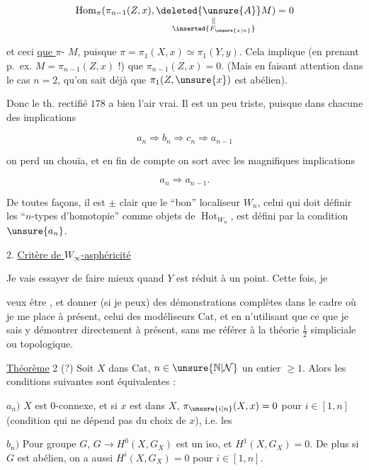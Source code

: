
\[
\operatorname{Hom}_{\pi}(\pi_{n-1}(Z,x),\underset{\substack{\Vert\\\inserted{F_{\unsure{x|n}}}}}{\deleted{\unsure{A}}M})=0
\]

et ceci \uline{ que  } $\pi$- $M$, puisque $\pi=\pi_1(X,x)\simeq\pi_1(Y,y)$. Cela implique (en prenant p.~ex. $M=\pi_{n-1}(Z,x)$ !) que $\pi_{n-1}(Z,x)=0$. (Mais en faisant attention dans le cas $n=2$, qu'on sait déjà que $\pi_1(Z,\unsure{x})$ est abélien).

Donc le th. rectifié  $178$ a bien l'air vrai. Il est un peu triste, puisque dans chacune des implications

\[
a_n\Longrightarrow b_n\Longrightarrow c_n\Longrightarrow a_{n-1}
\]

on perd un chouïa, et en fin de compte on sort avec les magnifiques implications

\[
a_n\Longrightarrow a_{n-1}.
\]

De toutes façons, il est $\pm$ clair que le ``bon'' localiseur $W_n$, celui qui doit définir les ``$n$-types d'homotopie'' comme objets de $\operatorname{Hot}_{W_n}$, est défini par la condition $\unsure{a_n}$.

2. \uline{Critère de $W_\infty$-asphéricité}

Je vais essayer de faire mieux quand $Y$ est réduit à un point. Cette fois, je

veux être , et donner (si je peux) des démonstrations complètes dans le cadre où je me place à présent, celui des modéliseurs $\mathrm{Cat}$, et en n'utilisant que ce que je sais y démontrer directement à présent, sans me référer à  la théorie $\frac12$ simpliciale ou topologique.

\uline{Théorème} 2 (?) Soit $X$ dans $\mathrm{Cat}$, $n\in\unsure{\mathbb N|\mathcal N}$ un entier $\geqslant 1$. Alors les conditions suivantes sont équivalentes :

$a_n)$ $X$ est $0$-connexe, et  si $x$ est dans $X$, $\pi_{\unsure{i|n}}(X,x)=0$ pour $i\in[1,n]$ (condition qui ne dépend pas du choix de $x$), i.e. les 

$b_n)$ Pour    groupe  $G$, $G\longrightarrow H^0(X,G_X)$ est un iso, et  $H^1(X,G_X)=0$. De plus si $G$ est abélien, on a aussi $H^i(X,G_X)=0$ pour $i\in[1,n]$.

